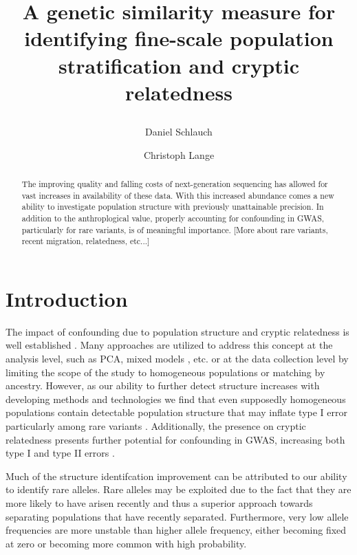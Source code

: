 \documentclass[english]{article}
\begin{document}
\title{A genetic similarity measure for identifying fine-scale population
stratification and cryptic relatedness\author[1]{Daniel Schlauch} 
\author[1]{Christoph Lange}
}
\maketitle
\begin{abstract}
The improving quality and falling costs of next-generation sequencing
has allowed for vast increases in availability of these data. With
this increased abundance comes a new ability to investigate population
structure with previously unattainable precision. In addition to the
anthroplogical value, properly accounting for confounding in GWAS,
particularly for rare variants, is of meaningful importance. {[}More
about rare variants, recent migration, relatedness, etc...{]}
\end{abstract}

\section*{Introduction}

The impact of confounding due to population structure and cryptic
relatedness is well established \cite{ptak2002evidence, pritchard2000association, roeder2009searching}.
Many approaches are utilized to address this concept at the analysis
level, such as PCA\cite{price2006principal,price2010new}, mixed models
\cite{listgarten2012improved,zhou2012genome,yang2014advantages,kang2010variance},
etc. or at the data collection level by limiting the scope of the
study to homogeneous populations or matching by ancestry. However,
as our ability to further detect structure increases with developing
methods and technologies we find that even supposedly homogeneous
populations contain detectable population structure that may inflate
type I error particularly among rare variants \cite{mathieson2012differential}.
Additionally, the presence on cryptic relatedness presents further
potential for confounding in GWAS, increasing both type I and type
II errors \cite{voight2005confounding, sun2012identifying,li2014relationship}.

Much of the structure identifcation improvement can be attributed
to our ability to identify rare alleles. Rare alleles may be exploited
due to the fact that they are more likely to have arisen recently
and thus a superior approach towards separating populations that have
recently separated\cite{mathieson2014demography}. Furthermore, very
low allele frequencies are more unstable than higher allele frequency,
either becoming fixed at zero or becoming more common with high probability. 
\end{document}
